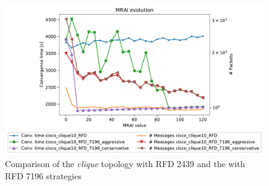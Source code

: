 \begin{figure}[h]
    \centering
    \includegraphics[width=\textwidth]{images/RFD/clique/cisco_clique10_RFD_comparison_constant_all.pdf}
	\caption{Comparison of the \textit{clique} topology with RFD 2439 and the with 
		RFD 7196 strategies}
    \label{fig:clique_RFD2439VSRFD7196}
\end{figure}

